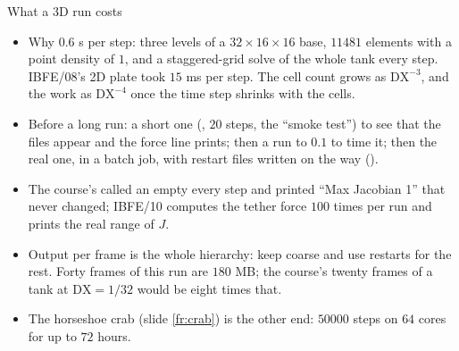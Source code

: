 \documentclass[aspectratio=169,11pt]{beamer}
\begin{document}
\begin{frame}{What a 3D run costs}
\label{fr:cost}
\footnotesize
\begin{itemize}
  \item Why $0.6$ s per step: three levels of a $32\times16\times16$ base, $11481$ elements with a point density of $1$, and a staggered-grid solve of the whole tank every step. IBFE/08's 2D plate took $15$ ms per step. The cell count grows as $\mathrm{DX}^{-3}$, and the work as $\mathrm{DX}^{-4}$ once the time step shrinks with the cells.
  \item Before a long run: a short one (, $20$ steps, the ``smoke test'') to see that the files appear and the force line prints; then a run to $0.1$ to time it; then the real one, in a batch job, with restart files written on the way ().
  \item The course's  called an empty  every step and printed ``Max Jacobian 1'' that never changed; IBFE/10 computes the tether force $100$ times per run and prints the real range of $J$.
  \item Output per frame is the whole hierarchy: keep  coarse and use restarts for the rest. Forty frames of this run are $180$ MB; the course's twenty frames of a tank at $\mathrm{DX} = 1/32$ would be eight times that.
  \item The horseshoe crab (slide \ref{fr:crab}) is the other end: $50000$ steps on $64$ cores for up to $72$ hours.
\end{itemize}
\end{frame}
\end{document}
